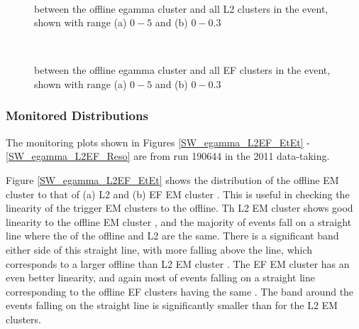 \begin{figure}
\centering
\mbox{
   \quad
      \quad
}
\caption[\dr{} between offline and L2 egamma object]{\dr{} between the offline egamma cluster and all L2 clusters in the event, shown with range (a) $0 - 5$ and (b) $0 - 0.3$ \label{SW_egamma_L2_dR}}
\end{figure}

\begin{figure}
\centering
\mbox{
   \quad
      \quad
}
\caption[\dr{} between offline and EF egamma object]{\dr{} between the offline egamma cluster and all EF clusters in the event, shown with range (a) $0 - 5$ and (b) $0 - 0.3$\label{SW_egamma_EF_dR}}
\end{figure}




\subsubsection{Monitored Distributions}


The monitoring plots shown in Figures \ref{SW_egamma_L2EF_EtEt} -\ref{SW_egamma_L2EF_Reso} are from run 190644 in the  2011 data-taking.


Figure \ref{SW_egamma_L2EF_EtEt} shows the distribution of the offline EM cluster \et{} to that of (a) L2 and (b) EF EM cluster \et{}.
This is useful in checking the linearity of the trigger EM clusters to the offline. 
Th L2 EM cluster \et{} shows good linearity to the offline EM cluster \et{}, and the majority of events fall on a straight line where the \et{} of the offline and L2 are the same.
There is a significant band either side of this straight line, with more falling above the line, which corresponds to a larger offline than L2 EM cluster \et{}.
The EF EM cluster \et{} has an even better linearity, and again most of events falling on a straight line corresponding to the offline EF clusters having the same \et{}.
The band around the events falling on the straight line is significantly smaller than for the L2 EM clusters.


